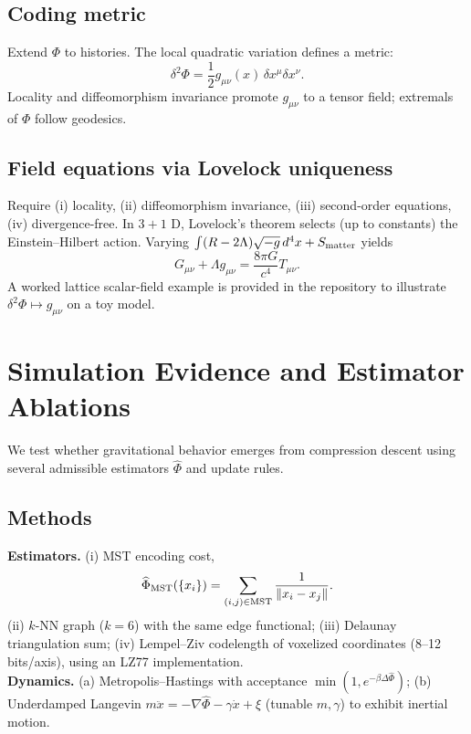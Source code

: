 \documentclass[aps,preprint,onecolumn,longbibliography,nofootinbib]{revtex4-2}
\numberwithin{equation}{section}        %
\begin{document}
\subsection{Coding metric}
Extend $\Phi$ to histories. The local quadratic variation defines a metric:
\begin{equation}
\delta^2\Phi = \frac{1}{2} g_{\mu\nu}(x)\,\delta x^\mu \delta x^\nu. \label{eq:metric}
\end{equation}
Locality and diffeomorphism invariance promote $g_{\mu\nu}$ to a tensor field; extremals of $\Phi$ follow geodesics.

\subsection{Field equations via Lovelock uniqueness}
Require (i) locality, (ii) diffeomorphism invariance, (iii) second-order equations, (iv) divergence-free. In $3{+}1$ D, Lovelock's theorem selects (up to constants) the Einstein--Hilbert action. Varying $\int (R-2\Lambda)\sqrt{-g}\,d^4x + S_{\rm matter}$ yields
\begin{equation}
G_{\mu\nu}+\Lambda g_{\mu\nu} = \frac{8\pi G}{c^4}T_{\mu\nu}. \label{eq:einstein}
\end{equation}
A worked lattice scalar-field example is provided in the repository to illustrate $\delta^2\Phi\mapsto g_{\mu\nu}$ on a toy model.

\section{Simulation Evidence and Estimator Ablations}
We test whether gravitational behavior emerges from compression descent using several admissible estimators $\widehat\Phi$ and update rules.

\subsection{Methods}
\textbf{Estimators.} (i) MST encoding cost,
\begin{equation}
\widehat\Phi_{\rm MST}(\{x_i\})=\sum_{(i,j)\in {\rm MST}}\frac{1}{\|x_i-x_j\|}. \label{eq:mst}
\end{equation}
(ii) $k$-NN graph ($k=6$) with the same edge functional; (iii) Delaunay triangulation sum; (iv) Lempel--Ziv codelength of voxelized coordinates (8--12 bits/axis), using an LZ77 implementation.\\
\textbf{Dynamics.} (a) Metropolis--Hastings with acceptance $\min(1,e^{-\beta\Delta\widehat\Phi})$; (b) Underdamped Langevin $m\ddot x = -\nabla \widehat\Phi - \gamma \dot x+\xi$ (tunable $m,\gamma$) to exhibit inertial motion.
\end{document}
